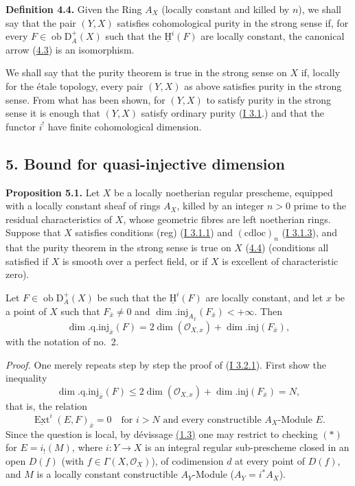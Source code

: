 \documentclass[11pt]{article}
\providecommand{\uH}{\underline{\mathrm H}}
\DeclareMathOperator{\Ext}{Ext}
\newcommand{\D}{\mathrm{D}}
\newcommand{\ob}{\operatorname{ob}}
\providecommand{\ob}{\operatorname{ob}}
\begin{document}
\label{sga5:I:definition:4.4}\textbf{Definition 4.4.} Given the Ring $A_X$ (locally constant and killed by $n$), we shall say that the pair $(Y,X)$ satisfies cohomological purity in the strong sense if, for every $F\in\ob\D_A^+(X)$ such that the $\uH^i(F)$ are locally constant, the canonical arrow (\hyperref[sga5:I:equation:4.3]{4.3}) is an isomorphism.

We shall say that the purity theorem is true in the strong sense on $X$ if, locally for the étale topology, every pair $(Y,X)$ as above satisfies purity in the strong sense. From what has been shown, for $(Y,X)$ to satisfy purity in the strong sense it is enough that $(Y,X)$ satisfy ordinary purity (\hyperref[sga5:I:subsection:3.1]{I 3.1}.) and that the functor $i^!$ have finite cohomological dimension.

\subsection*{5. Bound for quasi-injective dimension}\label{sga5:I:subsection:5}

\label{sga5:I:proposition:5.1}\textbf{Proposition 5.1.} Let $X$ be a locally noetherian regular prescheme, equipped with a locally constant sheaf of rings $A_X$, killed by an integer $n>0$ prime to the residual characteristics of $X$, whose geometric fibres are left noetherian rings. Suppose that $X$ satisfies conditions (reg) (\hyperref[sga5:I:statement:3.1.1]{I 3.1.1}) and $(\mathrm{cdloc})_n$ (\hyperref[sga5:I:statement:3.1.3]{I 3.1.3}), and that the purity theorem in the strong sense is true on $X$ (\hyperref[sga5:I:definition:4.4]{4.4}) (conditions all satisfied if $X$ is smooth over a perfect field, or if $X$ is excellent of characteristic zero).

Let $F\in\ob\D_A^+(X)$ be such that the $\uH^i(F)$ are locally constant, and let $x$ be a point of $X$ such that $F_{\bar{x}}\neq0$ and $\dim.\mathrm{inj}_{A_{\bar{x}}}(F_{\bar{x}})<+\infty$. Then
\[
        \dim.\mathrm{q.inj}_{\bar{x}}(F)=2\dim(\mathcal{O}_{X,x})+\dim.\mathrm{inj}(F_{\bar{x}}),
\]
with the notation of no.~2.

\emph{Proof.} One merely repeats step by step the proof of (\hyperref[sga5:I:proposition:3.2.1]{I 3.2.1}). First show the inequality
\[
        \dim.\mathrm{q.inj}_{\bar{x}}(F)\leq 2\dim(\mathcal{O}_{X,x})+\dim.\mathrm{inj}(F_{\bar{x}})=N,
\]
that is, the relation
\begin{equation}\tag{*}\label{sga5:I:equation:unnumbered:6}
        \underline{\Ext}^{i}(E,F)_{\bar{x}}=0\quad\text{for } i>N\text{ and every constructible }A_X\text{-Module }E.
\end{equation}
Since the question is local, by dévissage \hyperref[sga5:I:proposition:1.3:2]{(1.3)} one may restrict to checking $(*)$ for $E=i_!(M)$, where $i:Y\to X$ is an integral regular sub-prescheme closed in an open $D(f)$ (with $f\in\Gamma(X,\mathcal{O}_X)$), of codimension $d$ at every point of $D(f)$, and $M$ is a locally constant constructible $A_Y$-Module ($A_Y=i^*A_X$).
\end{document}
